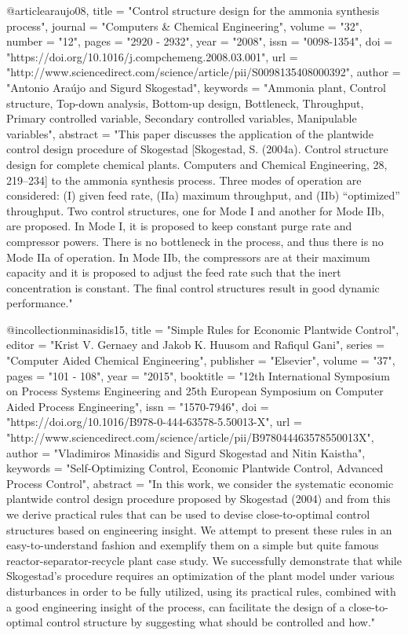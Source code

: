 @article{araujo08,
title = "Control structure design for the ammonia synthesis process",
journal = "Computers \& Chemical Engineering",
volume = "32",
number = "12",
pages = "2920 - 2932",
year = "2008",
issn = "0098-1354",
doi = "https://doi.org/10.1016/j.compchemeng.2008.03.001",
url = "http://www.sciencedirect.com/science/article/pii/S0098135408000392",
author = "Antonio Araújo and Sigurd Skogestad",
keywords = "Ammonia plant, Control structure, Top-down analysis, Bottom-up design, Bottleneck, Throughput, Primary controlled variable, Secondary controlled variables, Manipulable variables",
abstract = "This paper discusses the application of the plantwide control design procedure of Skogestad [Skogestad, S. (2004a). Control structure design for complete chemical plants. Computers and Chemical Engineering, 28, 219–234] to the ammonia synthesis process. Three modes of operation are considered: (I) given feed rate, (IIa) maximum throughput, and (IIb) “optimized” throughput. Two control structures, one for Mode I and another for Mode IIb, are proposed. In Mode I, it is proposed to keep constant purge rate and compressor powers. There is no bottleneck in the process, and thus there is no Mode IIa of operation. In Mode IIb, the compressors are at their maximum capacity and it is proposed to adjust the feed rate such that the inert concentration is constant. The final control structures result in good dynamic performance."
}

@incollection{minasidis15,
title = "Simple Rules for Economic Plantwide Control",
editor = "Krist V. Gernaey and Jakob K. Huusom and Rafiqul Gani",
series = "Computer Aided Chemical Engineering",
publisher = "Elsevier",
volume = "37",
pages = "101 - 108",
year = "2015",
booktitle = "12th International Symposium on Process Systems Engineering and 25th European Symposium on Computer Aided Process Engineering",
issn = "1570-7946",
doi = "https://doi.org/10.1016/B978-0-444-63578-5.50013-X",
url = "http://www.sciencedirect.com/science/article/pii/B978044463578550013X",
author = "Vladimiros Minasidis and Sigurd Skogestad and Nitin Kaistha",
keywords = "Self-Optimizing Control, Economic Plantwide Control, Advanced Process Control",
abstract = "In this work, we consider the systematic economic plantwide control design procedure proposed by Skogestad (2004) and from this we derive practical rules that can be used to devise close-to-optimal control structures based on engineering insight. We attempt to present these rules in an easy-to-understand fashion and exemplify them on a simple but quite famous reactor-separator-recycle plant case study. We successfully demonstrate that while Skogestad’s procedure requires an optimization of the plant model under various disturbances in order to be fully utilized, using its practical rules, combined with a good engineering insight of the process, can facilitate the design of a close-to-optimal control structure by suggesting what should be controlled and how."
}

